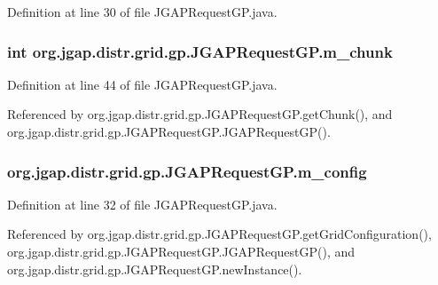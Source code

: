 Definition at line 30 of file J\-G\-A\-P\-Request\-G\-P.\-java.

\hypertarget{classorg_1_1jgap_1_1distr_1_1grid_1_1gp_1_1_j_g_a_p_request_g_p_a6ecaefdb003bc276f2b6063608e12e89}{
\subsubsection[{m\-\_\-chunk}]{\setlength{\rightskip}{0pt plus 5cm}int org.\-jgap.\-distr.\-grid.\-gp.\-J\-G\-A\-P\-Request\-G\-P.\-m\-\_\-chunk\hspace{0.3cm}{\ttfamily [private]}}}\label{classorg_1_1jgap_1_1distr_1_1grid_1_1gp_1_1_j_g_a_p_request_g_p_a6ecaefdb003bc276f2b6063608e12e89}


Definition at line 44 of file J\-G\-A\-P\-Request\-G\-P.\-java.



Referenced by org.\-jgap.\-distr.\-grid.\-gp.\-J\-G\-A\-P\-Request\-G\-P.\-get\-Chunk(), and org.\-jgap.\-distr.\-grid.\-gp.\-J\-G\-A\-P\-Request\-G\-P.\-J\-G\-A\-P\-Request\-G\-P().

\hypertarget{classorg_1_1jgap_1_1distr_1_1grid_1_1gp_1_1_j_g_a_p_request_g_p_a05cfc36865ece8db007b053836af3b5c}{
\subsubsection[{m\-\_\-config}]{ org.\-jgap.\-distr.\-grid.\-gp.\-J\-G\-A\-P\-Request\-G\-P.\-m\-\_\-config\hspace{0.3cm}{\ttfamily [private]}}}\label{classorg_1_1jgap_1_1distr_1_1grid_1_1gp_1_1_j_g_a_p_request_g_p_a05cfc36865ece8db007b053836af3b5c}


Definition at line 32 of file J\-G\-A\-P\-Request\-G\-P.\-java.



Referenced by org.\-jgap.\-distr.\-grid.\-gp.\-J\-G\-A\-P\-Request\-G\-P.\-get\-Grid\-Configuration(), org.\-jgap.\-distr.\-grid.\-gp.\-J\-G\-A\-P\-Request\-G\-P.\-J\-G\-A\-P\-Request\-G\-P(), and org.\-jgap.\-distr.\-grid.\-gp.\-J\-G\-A\-P\-Request\-G\-P.\-new\-Instance().

